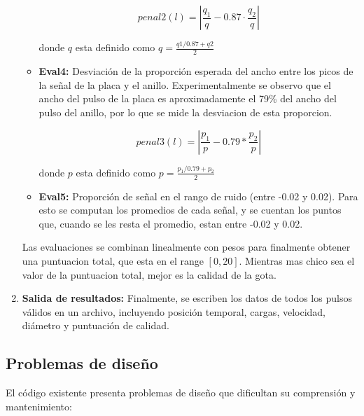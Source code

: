 \documentclass[12pt,a4paper]{article}
\begin{document}
\begin{enumerate}
\begin{itemize}
    \begin{equation}
        penal2(l) = \left|\frac{q_1}{q} - 0.87 \cdot \frac{q_2}{q}\right|
    \end{equation}

    donde $q$ esta definido como $q = \frac{q1 / 0.87 + q2}{2}$
    
    \item \textbf{Eval4:} Desviación de la proporción esperada del ancho entre los picos de la
señal de la placa y el anillo. Experimentalmente se observo que el ancho del pulso de la placa es aproximadamente el 79\% del ancho del pulso del anillo, por lo que se mide la desviacion de esta proporcion.

    \begin{equation}
        penal3(l) = \left|\frac{p_1}{p} - 0.79 * \frac{p_2}{p}\right|
    \end{equation}

    donde $p$ esta definido como $p = \frac{p_1 / 0.79 + p_2}{2}$

    \item \textbf{Eval5:} Proporción de señal en el rango de ruido (entre -0.02 y 0.02). Para esto se computan los promedios de cada señal, y se cuentan los puntos que, cuando se les resta el promedio, estan entre -0.02 y 0.02.

\end{itemize}

    Las evaluaciones se combinan linealmente con pesos para finalmente obtener una puntuacion total, que esta en el range $[0, 20]$. Mientras mas chico sea el valor de la puntuacion total, mejor es la calidad de la gota.
    
\item \textbf{Salida de resultados:} Finalmente, se escriben los datos de todos los pulsos válidos
en un archivo, incluyendo posición temporal, cargas, velocidad, diámetro y puntuación de calidad.

\end{enumerate}

\subsection{Problemas de diseño}

El código existente presenta problemas de diseño que dificultan su comprensión y mantenimiento:
\end{document}
